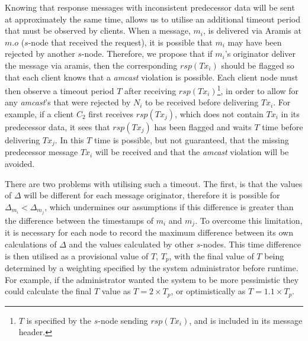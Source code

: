     Knowing that response messages with inconsistent predecessor data will be sent at approximately the same time, allows us to utilise an additional timeout period that must be observed by clients.  When a message, $m_i$, is delivered via \textsf{Aramis} at $m.o$ ($s$-node that received the request), it is possible that $m_i$ may have been rejected by another $s$-node.  Therefore, we propose that if $m_i$'s originator deliver the message via \textsf{aramis}, then the corresponding $rsp(Tx_i)$ should be flagged so that each client knows that a \emph{amcast} violation is possible.  Each client node must then observe a timeout period $T$ after receiving $rsp(Tx_i)$\footnote{$T$ is specified by the $s$-node sending $rsp(Tx_i)$, and is included in its message header.}, in order to allow for any \emph{amcast}'s that were rejected by $N_i$ to be received before delivering $Tx_i$.  For example, if a client $C_2$ first receives $rsp(Tx_j)$, which does not contain $Tx_i$ in its predecessor data, it sees that $rsp(Tx_j)$ has been flagged and waits $T$ time before delivering $Tx_j$. In this $T$ time is possible, but not guaranteed, that the missing predecessor message $Tx_i$ will be received and that the \emph{amcast} violation will be avoided.  
    
    There are two problems with utilising such a timeout.  The first, is that the values of $\Delta$ will be different for each message originator, therefore it is possible for $\Delta_{m_i} < \Delta_{m_j}$, which undermines our assumptions if this difference is greater than the difference between the timestamps of $m_i$ and $m_j$.  To overcome this limitation, it is necessary for each node to record the maximum difference between its own calculations of $\Delta$ and the values calculated by other $s$-nodes.  This time difference is then utilised as a provisional value of $T$, $T_p$, with the final value of $T$ being determined by a weighting specified by the system administrator before runtime.  For example, if the administrator wanted the system to be more pessimistic they could calculate the final $T$ value as $T=2 \times T_p$, or optimistically as $T=1.1 \times T_p$.  
    

